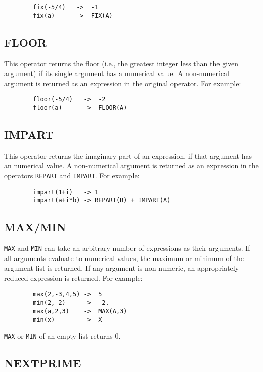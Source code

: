 \begin{verbatim}
        fix(-5/4)   ->  -1
        fix(a)      ->  FIX(A)
\end{verbatim}

\subsection{FLOOR}
\hypertarget{operator:FLOOR}{}
This operator returns the floor (i.e., the greatest integer less than
the given argument) if its single argument has a numerical value.  A
non-numerical argument is returned as an expression in the original
operator.  For example:

\begin{verbatim}
        floor(-5/4)   ->  -2
        floor(a)      ->  FLOOR(A)
\end{verbatim}

\subsection{IMPART}
\hypertarget{operator:IMPART}{}
This operator returns the imaginary part of an expression, if that argument
has an numerical value.  A non-numerical argument is returned as an expression
in the operators \texttt{REPART} and \texttt{IMPART}.  For example:
\begin{verbatim}
        impart(1+i)   -> 1
        impart(a+i*b) -> REPART(B) + IMPART(A)
\end{verbatim}

\subsection{MAX/MIN}
\hypertarget{operator:MAX}{}
\hypertarget{operator:MIN}{}

\texttt{MAX} and \texttt{MIN} can take an arbitrary
number of expressions as their arguments.  If all arguments evaluate to
numerical values, the maximum or minimum of the argument list is returned.
If any argument is non-numeric, an appropriately reduced expression is
returned.  For example:
\begin{verbatim}
        max(2,-3,4,5) ->  5
        min(2,-2)     ->  -2.
        max(a,2,3)    ->  MAX(A,3)
        min(x)        ->  X
\end{verbatim}
\texttt{MAX} or \texttt{MIN} of an empty list returns 0.

\subsection{NEXTPRIME}
\hypertarget{operator:NEXTPRIME}{}

